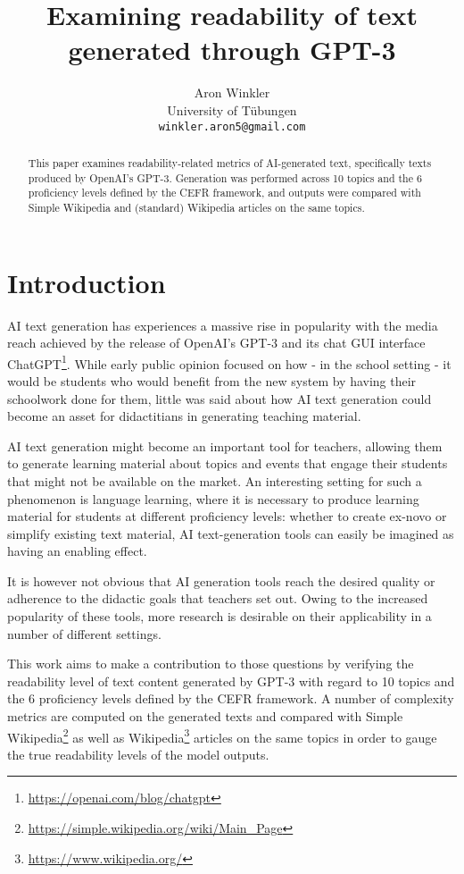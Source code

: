 \documentclass[11pt]{article}
\title{Examining readability of text generated through GPT-3 }
\author{Aron Winkler \\
  University of Tübungen \\
  \texttt{winkler.aron5@gmail.com}}
\begin{document}
\maketitle
\begin{abstract}
    This paper examines readability-related metrics of AI-generated text, specifically texts produced by OpenAI's GPT-3. Generation was performed across 10 topics and the 6 proficiency levels defined by the CEFR framework, and outputs were compared with Simple Wikipedia and (standard) Wikipedia articles on the same topics.
\end{abstract}

\section{Introduction}

AI text generation has experiences a massive rise in popularity with the media reach achieved by the release of OpenAI's GPT-3 \citep{brown2020language} and its chat GUI interface ChatGPT\footnote{\url{https://openai.com/blog/chatgpt}}. While early public opinion focused on how - in the school setting - it would be students who would benefit from the new system by having their schoolwork done for them, little was said about how AI text generation could become an asset for didactitians in generating teaching material.

AI text generation might become an important tool for teachers, allowing them to generate learning material about topics and events that engage their students that might not be available on the market. An interesting setting for such a phenomenon is language learning, where it is necessary to produce learning material for students at different proficiency levels: whether to create ex-novo or simplify existing text material, AI text-generation tools can easily be imagined as having an enabling effect. 

It is however not obvious that AI generation tools reach the desired quality or adherence to the didactic goals that teachers set out. Owing to the increased popularity of these tools, more research is desirable on their applicability in a number of different settings.

This work aims to make a contribution to those questions by verifying the readability level of text content generated by GPT-3 with regard to 10 topics and the 6 proficiency levels defined by the CEFR framework. A number of complexity metrics are computed on the generated texts and compared with Simple Wikipedia\footnote{\url{https://simple.wikipedia.org/wiki/Main_Page}} as well as Wikipedia\footnote{\url{https://www.wikipedia.org/}} articles on the same topics in order to gauge the true readability levels of the model outputs.
\end{document}
